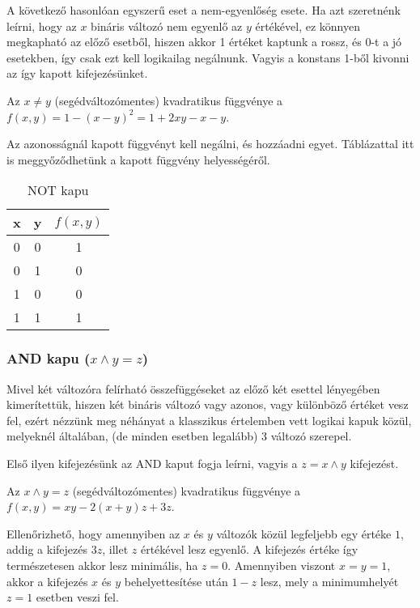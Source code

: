 A következő hasonlóan egyszerű eset a nem-egyenlőség esete. Ha azt szeretnénk leírni, hogy az $x$ bináris változó nem egyenlő az $y$ értékével, ez könnyen megkapható az előző esetből, hiszen akkor 1 értéket kaptunk a rossz, és 0-t a jó esetekben, így csak ezt kell logikailag negálnunk. Vagyis a konstans 1-ből kivonni az így kapott kifejezésünket.

\begin{allitas}
	Az $x \neq y$ (segédváltozómentes) kvadratikus függvénye a $f(x,y)=1-(x-y)^2=1+2xy-x-y$.
	
	Az azonosságnál kapott függvényt kell negálni, és hozzáadni egyet. Táblázattal itt is meggyőződhetünk a kapott függvény helyességéről.
\end{allitas}

	\begin{table}[ht]
		\footnotesize
		\centering
		\begin{tabular}{ c c c }
			\toprule
			x & y & $f(x,y)$ \\
			\midrule
			0 & 0 & 1 \\
			0 & 1 & 0 \\
			1 & 0 & 0 \\
			1 & 1 & 1 \\		
			\bottomrule
		\end{tabular}
		\caption{NOT kapu}
		\label{tab:NOTgate}
	\end{table}	


\subsubsection{AND kapu ($x \wedge y = z$)}

Mivel két változóra felírható összefüggéseket az előző két esettel lényegében kimerítettük, hiszen két bináris változó vagy azonos, vagy különböző értéket vesz fel, ezért nézzünk meg néhányat a klasszikus értelemben vett logikai kapuk közül, melyeknél általában, (de minden esetben legalább) 3 változó szerepel.


Első ilyen kifejezésünk az AND kaput fogja leírni, vagyis a $z=x \wedge y$ kifejezést.
\begin{allitas}
	Az $x \wedge y = z$ (segédváltozómentes) kvadratikus függvénye a $f(x,y)=xy-2(x+y)z+3z$.
	
	Ellenőrizhető, hogy amennyiben az $x$ és $y$ változók közül legfeljebb egy értéke $1$, addig a kifejezés $3z$, illet $z$ értékével lesz egyenlő. A kifejezés értéke így természetesen akkor lesz minimális, ha $z=0$. Amennyiben viszont $x=y=1$, akkor a kifejezés $x$ és $y$ behelyettesítése után $1-z$ lesz, mely a minimumhelyét $z=1$ esetben veszi fel.	
\end{allitas}

